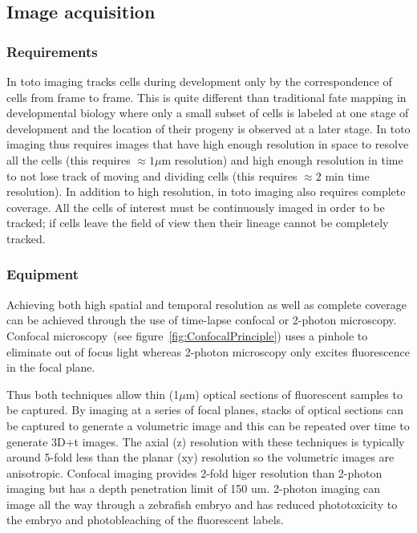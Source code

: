 
\subsection{Image acquisition}

\subsubsection{Requirements}

In toto imaging tracks cells during development only by the correspondence of
cells from frame to frame. This is quite different than traditional fate mapping
in developmental biology where only a small subset of cells is labeled at one
stage of development and the location of their progeny is observed at a
later stage. In toto imaging thus requires images that have high enough
resolution in space to resolve all the cells (this requires $\approx
1 \mu$m resolution) and high enough resolution in time to not lose track of
moving and dividing cells (this requires $\approx 2$ min time resolution). In
addition to high resolution, in toto imaging also requires complete coverage.
All the cells of interest must be continuously imaged in order to be tracked; if
cells leave the field of view then their lineage cannot be completely tracked.

\subsubsection{Equipment}

Achieving both high spatial and temporal resolution as well as complete coverage
can be achieved through the use of time-lapse confocal or 2-photon microscopy.
Confocal microscopy~(see figure~\ref{fig:ConfocalPrinciple}) uses a pinhole to
eliminate out of focus light whereas 2-photon microscopy only excites
fluorescence in the focal plane.

Thus both techniques allow thin (1$\mu$m) optical sections of fluorescent
samples to be captured. By imaging at a series of focal planes, stacks of
optical sections can be captured to generate a volumetric image and this can be
repeated over time to generate 3D+t images. The axial (z) resolution with these
techniques is typically around 5-fold less than the planar (xy) resolution so
the volumetric images are anisotropic. Confocal imaging provides 2-fold higer
resolution than 2-photon imaging but has a depth penetration limit of  150 um.
2-photon imaging can image all the way through a zebrafish embryo and has
reduced phototoxicity to the embryo and photobleaching of the fluorescent
labels.\\

